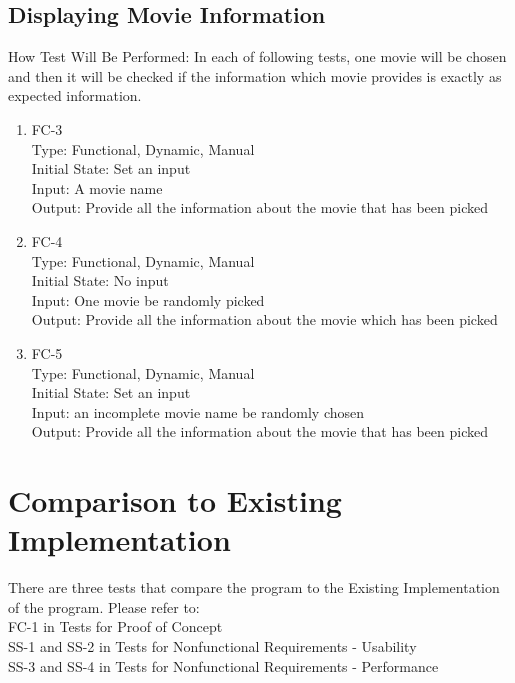 \documentclass[12pt, titlepage]{article}
\begin{document}
\subsection{Displaying Movie Information}
How Test Will Be Performed: In each of following tests, one movie will be chosen and then it will be checked if the information which movie provides is exactly as expected information.

\begin{enumerate}
\item{FC-3}\\
Type:  Functional, Dynamic, Manual\\
Initial State: Set an input\\
Input: A movie name \\
Output: Provide all the information about the movie that has been picked


\item{FC-4\\}
Type:  Functional, Dynamic, Manual\\
Initial State: No input \\
Input: One movie be randomly picked\\
Output: Provide all the information about the movie which has been picked

\item{FC-5\\}
Type:  Functional, Dynamic, Manual\\
Initial State: Set an input\\
Input: an incomplete movie name be randomly chosen\\
Output: Provide all the information about the movie that has been picked
\end{enumerate}

\section{Comparison to Existing Implementation}	
There are three tests that compare the program to the Existing Implementation of the program. Please refer to:\\

FC-1 in Tests for Proof of Concept\\

SS-1 and SS-2 in Tests for Nonfunctional Requirements - Usability\\

SS-3 and SS-4 in Tests for Nonfunctional Requirements - Performance\\
\end{document}
